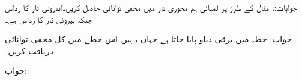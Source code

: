 جوابات:، 
مثال  کے طرز پر  لمبائی ہم محوری تار میں مخفی توانائی حاصل کریں۔اندرونی تار کا رداس  جبکہ بیرونی تار کا رداس  ہے۔

جواب:
خطہ  میں  برقی دباو پایا جاتا ہے جہاں ،  ہیں۔اس خطے میں کل مخفی توانائی دریافت کریں۔

جواب:
